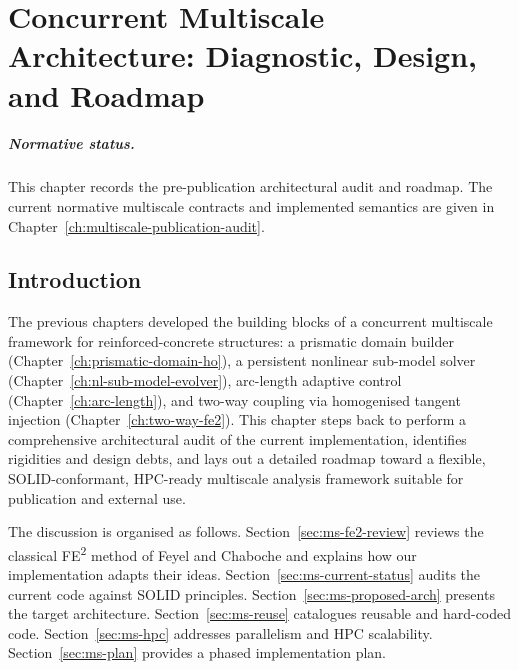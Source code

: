 
\chapter{Concurrent Multiscale Architecture: Diagnostic, Design, and Roadmap}
\label{ch:multiscale-architecture}

\paragraph{Normative status.}
This chapter records the pre-publication architectural audit and roadmap.  The
current normative multiscale contracts and implemented semantics are given in
Chapter~\ref{ch:multiscale-publication-audit}.


\section{Introduction}
\label{sec:ms-arch-intro}

The previous chapters developed the building blocks of a concurrent
multiscale framework for reinforced-concrete structures: a prismatic
domain builder (Chapter~\ref{ch:prismatic-domain-ho}), a persistent
nonlinear sub-model solver (Chapter~\ref{ch:nl-sub-model-evolver}),
arc-length adaptive control (Chapter~\ref{ch:arc-length}), and
two-way coupling via homogenised tangent injection
(Chapter~\ref{ch:two-way-fe2}).  This chapter steps back to perform a
comprehensive architectural audit of the current implementation,
identifies rigidities and design debts, and lays out a detailed
roadmap toward a flexible, SOLID-conformant, HPC-ready multiscale
analysis framework suitable for publication and external use.

The discussion is organised as follows.
Section~\ref{sec:ms-fe2-review} reviews the classical
FE\textsuperscript{2} method of Feyel and Chaboche and explains how
our implementation adapts their ideas.
Section~\ref{sec:ms-current-status} audits the current code against
SOLID principles.
Section~\ref{sec:ms-proposed-arch} presents the target architecture.
Section~\ref{sec:ms-reuse} catalogues reusable and hard-coded code.
Section~\ref{sec:ms-hpc} addresses parallelism and HPC scalability.
Section~\ref{sec:ms-plan} provides a phased implementation plan.



